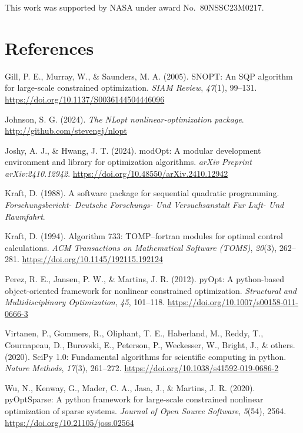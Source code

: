 \documentclass[
]{article}
\newlength{\cslhangindent}
\newenvironment{CSLReferences}[2] %
 {\begin{list}{}{%
  \setlength{\itemindent}{0pt}
  \setlength{\leftmargin}{0pt}
  \setlength{\parsep}{0pt}
  \ifodd #1
   \setlength{\leftmargin}{\cslhangindent}
   \setlength{\itemindent}{-1\cslhangindent}
  \fi
  \setlength{\itemsep}{#2\baselineskip}}}
 {\end{list}}
\begin{document}
This work was supported by NASA under award No.~80NSSC23M0217.

\section*{References}\label{references}

\label{refs}
\begin{CSLReferences}{1}{0}
Gill, P. E., Murray, W., \& Saunders, M. A. (2005). SNOPT: An SQP
algorithm for large-scale constrained optimization. \emph{SIAM Review},
\emph{47}(1), 99--131. \url{https://doi.org/10.1137/S0036144504446096}

Johnson, S. G. (2024). \emph{The {NLopt} nonlinear-optimization
package}. \url{http://github.com/stevengj/nlopt}

Joshy, A. J., \& Hwang, J. T. (2024). modOpt: A modular development
environment and library for optimization algorithms. \emph{arXiv
Preprint arXiv:2410.12942}.
\url{https://doi.org/10.48550/arXiv.2410.12942}

Kraft, D. (1988). A software package for sequential quadratic
programming. \emph{Forschungsbericht- Deutsche Forschungs- Und
Versuchsanstalt Fur Luft- Und Raumfahrt}.

Kraft, D. (1994). Algorithm 733: TOMP--fortran modules for optimal
control calculations. \emph{ACM Transactions on Mathematical Software
(TOMS)}, \emph{20}(3), 262--281.
\url{https://doi.org/10.1145/192115.192124}

Perez, R. E., Jansen, P. W., \& Martins, J. R. (2012). pyOpt: A
python-based object-oriented framework for nonlinear constrained
optimization. \emph{Structural and Multidisciplinary Optimization},
\emph{45}, 101--118. \url{https://doi.org/10.1007/s00158-011-0666-3}

Virtanen, P., Gommers, R., Oliphant, T. E., Haberland, M., Reddy, T.,
Cournapeau, D., Burovski, E., Peterson, P., Weckesser, W., Bright, J.,
\& others. (2020). SciPy 1.0: Fundamental algorithms for scientific
computing in python. \emph{Nature Methods}, \emph{17}(3), 261--272.
\url{https://doi.org/10.1038/s41592-019-0686-2}

Wu, N., Kenway, G., Mader, C. A., Jasa, J., \& Martins, J. R. (2020).
pyOptSparse: A python framework for large-scale constrained nonlinear
optimization of sparse systems. \emph{Journal of Open Source Software},
\emph{5}(54), 2564. \url{https://doi.org/10.21105/joss.02564}

\end{CSLReferences}
\end{document}
